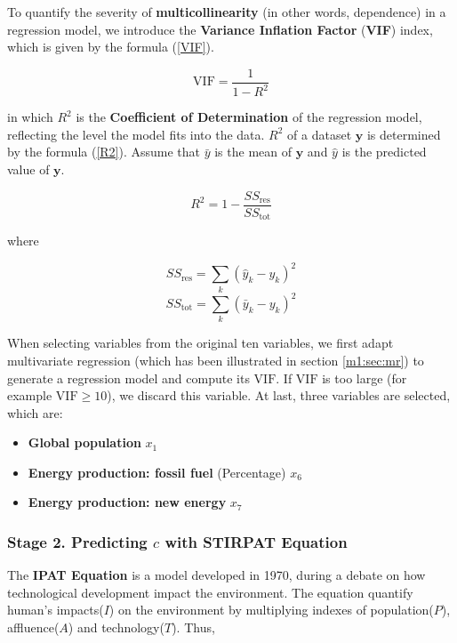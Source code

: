\documentclass[12pt]{article}
\begin{document}
To quantify the severity of \textbf{multicollinearity} (in other words, dependence) in a regression model, we introduce the \textbf{Variance Inflation Factor} (\textbf{VIF}) index, which is given by the formula (\ref{VIF}). 

\begin{equation}
    \text{VIF} = \frac{1}{1 - R^2}
    \label{VIF}
\end{equation}

in which $R^2$ is the \textbf{Coefficient of Determination} of the regression model, reflecting the level the model fits into the data. $R^2$ of a dataset $\boldsymbol{y}$ is determined by the formula (\ref{R2}). Assume that $\bar y$ is the mean of $\boldsymbol{y}$ and $\hat{y}$ is the predicted value of $\boldsymbol{y}$.

\begin{equation}
    R^2 = 1 - \frac{SS_{\text{res}}}{SS_{\text{tot}}}
    \label{R2}
\end{equation}

where

\begin{equation}
    SS_{\text{res}} = \sum\limits_{k} (\hat y_k - y_k) ^ 2
\end{equation}
\begin{equation}
    SS_{\text{tot}} = \sum\limits_{k} (\bar y_k - y_k) ^ 2
\end{equation}

When selecting variables from the original ten variables, we first adapt multivariate regression (which has been illustrated in section \ref{m1:sec:mr}) to generate a regression model and compute its $\text{VIF}$. If $\text{VIF}$ is too large (for example $\text{VIF} \ge 10$), we discard this variable. At last, three variables are selected, which are:

\begin{itemize}
    \item \textbf{Global population} $x_1$
    \item \textbf{Energy production: fossil fuel} (Percentage) $x_6$
    \item \textbf{Energy production: new energy} $x_7$
\end{itemize}

\subsubsection{Stage 2. Predicting $c$ with STIRPAT Equation}
The \textbf{IPAT Equation} is a model developed in 1970, during a debate on how technological development impact the environment. The equation quantify human's impacts($I$) on the environment by multiplying indexes of population($P$), affluence($A$) and technology($T$). Thus, 
\end{document}
